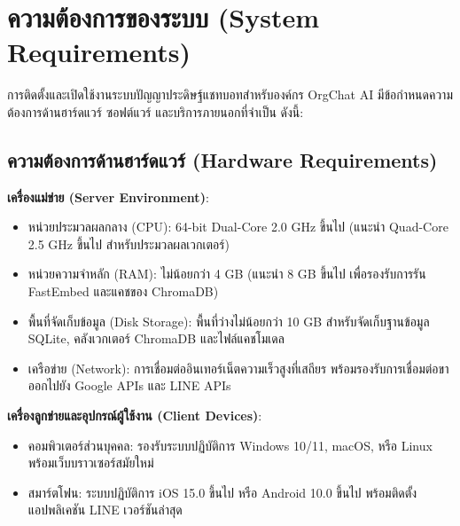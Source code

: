 \vspace{0.2in}

\section{ความต้องการของระบบ (System Requirements)}
\hspace*{1.3em}
การติดตั้งและเปิดใช้งานระบบปัญญาประดิษฐ์แชทบอทสำหรับองค์กร OrgChat AI มีข้อกำหนดความต้องการด้านฮาร์ดแวร์ ซอฟต์แวร์ และบริการภายนอกที่จำเป็น ดังนี้:

\subsection{ความต้องการด้านฮาร์ดแวร์ (Hardware Requirements)}
\begin{mycustomitem}
\item \textbf{เครื่องแม่ข่าย (Server Environment)}:
  \begin{itemize}[leftmargin=2em]
    \item หน่วยประมวลผลกลาง (CPU): 64-bit Dual-Core 2.0 GHz ขึ้นไป (แนะนำ Quad-Core 2.5 GHz ขึ้นไป สำหรับประมวลผลเวกเตอร์)
    \item หน่วยความจำหลัก (RAM): ไม่น้อยกว่า 4 GB (แนะนำ 8 GB ขึ้นไป เพื่อรองรับการรัน FastEmbed และแคชของ ChromaDB)
    \item พื้นที่จัดเก็บข้อมูล (Disk Storage): พื้นที่ว่างไม่น้อยกว่า 10 GB สำหรับจัดเก็บฐานข้อมูล SQLite, คลังเวกเตอร์ ChromaDB และไฟล์แคชโมเดล
    \item เครือข่าย (Network): การเชื่อมต่ออินเทอร์เน็ตความเร็วสูงที่เสถียร พร้อมรองรับการเชื่อมต่อขาออกไปยัง Google APIs และ LINE APIs
  \end{itemize}
\end{mycustomitem}

\begin{mycustomitem}
\item \textbf{เครื่องลูกข่ายและอุปกรณ์ผู้ใช้งาน (Client Devices)}:
  \begin{itemize}[leftmargin=2em]
    \item คอมพิวเตอร์ส่วนบุคคล: รองรับระบบปฏิบัติการ Windows 10/11, macOS, หรือ Linux พร้อมเว็บบราวเซอร์สมัยใหม่
    \item สมาร์ตโฟน: ระบบปฏิบัติการ iOS 15.0 ขึ้นไป หรือ Android 10.0 ขึ้นไป พร้อมติดตั้งแอปพลิเคชัน LINE เวอร์ชันล่าสุด
  \end{itemize}
\end{mycustomitem}


